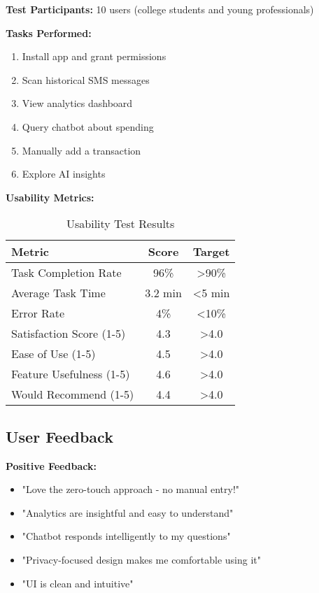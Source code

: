 \documentclass[11pt,a4paper]{report}
\begin{document}
\textbf{Test Participants:} 10 users (college students and young professionals)

\textbf{Tasks Performed:}
\begin{enumerate}
    \item Install app and grant permissions
    \item Scan historical SMS messages
    \item View analytics dashboard
    \item Query chatbot about spending
    \item Manually add a transaction
    \item Explore AI insights
\end{enumerate}

\textbf{Usability Metrics:}
\begin{table}[H]
\centering
\caption{Usability Test Results}
\begin{tabular}{|l|c|c|}
\hline
\textbf{Metric} & \textbf{Score} & \textbf{Target} \\
\hline
Task Completion Rate & 96\% & >90\% \\
Average Task Time & 3.2 min & <5 min \\
Error Rate & 4\% & <10\% \\
Satisfaction Score (1-5) & 4.3 & >4.0 \\
Ease of Use (1-5) & 4.5 & >4.0 \\
Feature Usefulness (1-5) & 4.6 & >4.0 \\
Would Recommend (1-5) & 4.4 & >4.0 \\
\hline
\end{tabular}
\end{table}

\subsection{User Feedback}

\textbf{Positive Feedback:}
\begin{itemize}
    \item "Love the zero-touch approach - no manual entry!"
    \item "Analytics are insightful and easy to understand"
    \item "Chatbot responds intelligently to my questions"
    \item "Privacy-focused design makes me comfortable using it"
    \item "UI is clean and intuitive"
\end{itemize}
\end{document}
